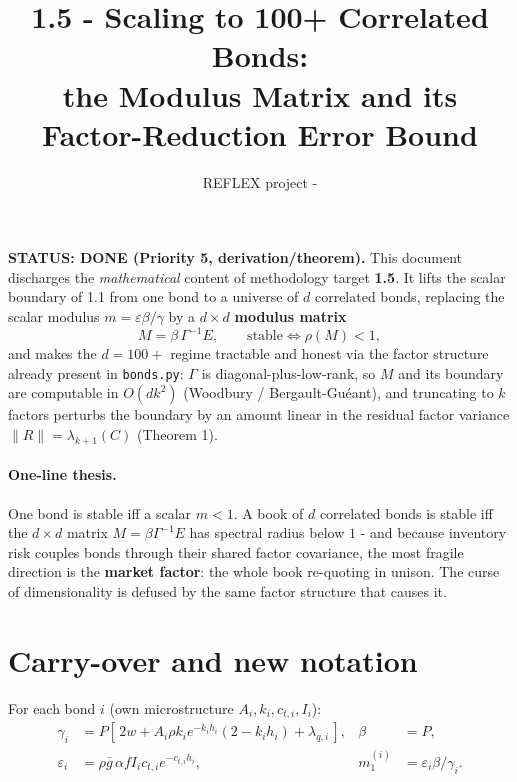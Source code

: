 \documentclass[11pt]{article}
\title{\textbf{1.5 - Scaling to 100+ Correlated Bonds:\\ the Modulus Matrix and its Factor-Reduction Error Bound}}
\author{REFLEX project - \code{math-theory}}
\date{}
\newcommand{\eps}{\varepsilon}
\newcommand{\code}[1]{\texttt{#1}}
\newcommand{\Gam}{\Gamma}
\newcommand{\Mmat}{M}
\begin{document}
\maketitle

\noindent\textbf{STATUS: DONE (Priority 5, derivation/theorem).} This document
discharges the \emph{mathematical} content of methodology target \textbf{1.5}. It
lifts the scalar boundary of 1.1 from one bond to a universe of $d$ correlated
bonds, replacing the scalar modulus $m=\eps\beta/\gamma$ by a $d\times d$
\textbf{modulus matrix}
%
\[
  \Mmat = \beta\,\Gam^{-1}E,\qquad \text{stable}\iff \rho(\Mmat)<1,
\]
%
and makes the $d=100+$ regime tractable and honest via the factor structure already
present in \code{bonds.py}: $\Gam$ is diagonal-plus-low-rank, so $\Mmat$ and its
boundary are computable in $O(dk^2)$ (Woodbury / Bergault-Gu\'eant), and truncating
to $k$ factors perturbs the boundary by an amount linear in the residual factor
variance $\|R\|=\lambda_{k+1}(C)$ (Theorem 1).

\paragraph{One-line thesis.}
One bond is stable iff a scalar $m<1$. A book of $d$ correlated bonds is stable iff
the $d\times d$ matrix $\Mmat=\beta\Gam^{-1}E$ has spectral radius below $1$ - and
because inventory risk couples bonds through their shared factor covariance, the
most fragile direction is the \textbf{market factor}: the whole book re-quoting in
unison. The curse of dimensionality is defused by the same factor structure that
causes it.

\section{Carry-over and new notation}

For each bond $i$ (own microstructure $A_i,k_i,c_{t,i},I_i$):
%
\begin{align*}
  \gamma_i &= P[\,2w + A_i\rho k_i e^{-k_i h_i}(2-k_i h_i) + \lambda_{q,i}\,], &
  \beta &= P,\\
  \eps_i &= \rho\bar g\,\alpha f I_i c_{t,i} e^{-c_{t,i}h_i}, &
  m_1^{(i)} &= \eps_i\beta/\gamma_i .
\end{align*}
\end{document}
